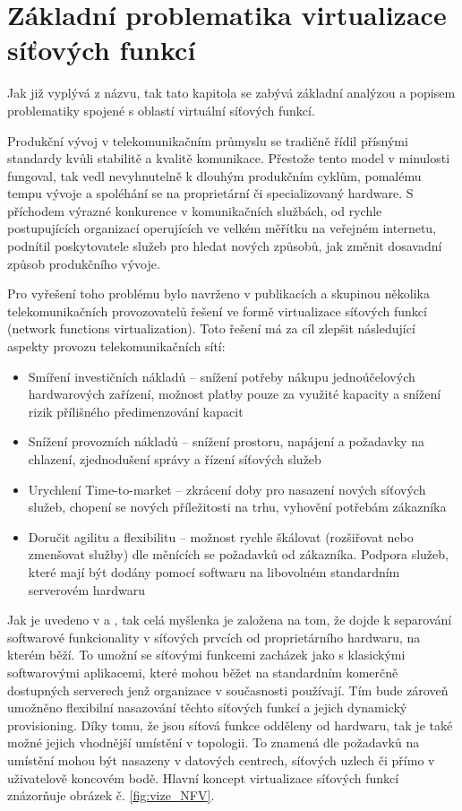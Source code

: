 \chapter{Základní problematika virtualizace síťových funkcí}
Jak již vyplývá z názvu, tak tato kapitola se zabývá základní analýzou a popisem problematiky spojené s oblastí virtuální síťových funkcí. 

Produkční vývoj v telekomunikačním průmyslu se tradičně řídil přísnými standardy kvůli stabilitě a kvalitě komunikace. Přestože tento model v minulosti fungoval, tak vedl nevyhnutelně k dlouhým produkčním cyklům, pomalému tempu vývoje a spoléhání se na proprietární či specializovaný hardware. S příchodem výrazné konkurence v komunikačních službách, od rychle postupujících organizací operujících ve velkém měřítku na veřejném internetu, podnítil poskytovatele služeb pro hledat nových způsobů, jak změnit dosavadní způsob produkčního vývoje.

Pro vyřešení toho problému bylo navrženo v publikacích \cite{NFV_paper2012} a \cite{NFV_paper2013} skupinou několika telekomunikačních provozovatelů řešení ve formě virtualizace síťových funkcí (network functions virtualization). Toto řešení má za cíl zlepšit následující aspekty provozu telekomunikačních sítí:

\begin{itemize}
\item Smíření investičních nákladů – snížení potřeby nákupu jednoúčelových hardwarových zařízení, možnost platby pouze za využité kapacity a snížení rizik přílišného předimenzování kapacit
\item Snížení provozních nákladů – snížení prostoru, napájení a požadavky na chlazení, zjednodušení správy a řízení síťových služeb
\item Urychlení Time-to-market – zkrácení doby pro nasazení nových síťových služeb, chopení se nových příležitosti na trhu, vyhovění potřebám zákazníka
\item Doručit agilitu a flexibilitu – možnost rychle škálovat (rozšiřovat nebo zmenšovat služby) dle měnících se požadavků od zákazníka. Podpora služeb, které mají být dodány pomocí softwaru na libovolném standardním serverovém hardwaru
\end{itemize}

Jak je uvedeno v \cite{NFVState} a \cite{NFVChalanges}, tak celá myšlenka je založena na tom, že dojde k separování softwarové funkcionality v síťových prvcích od proprietárního hardwaru, na kterém běží. To umožní se síťovými funkcemi zacházek jako s klasickými softwarovými aplikacemi, které mohou běžet na standardním komerčně dostupných serverech jenž organizace v současnosti používají. Tím bude zároveň umožněno flexibilní nasazování těchto síťových funkcí a jejich dynamický provisioning. Díky tomu, že jsou síťová funkce odděleny od hardwaru, tak je také možné jejich vhodnější umístění v topologii. To znamená dle požadavků na umístění mohou být nasazeny v datových centrech, síťových uzlech či přímo v uživatelově koncovém bodě. Hlavní koncept virtualizace síťových funkcí znázorňuje obrázek č. \ref{fig:vize_NFV}. 

